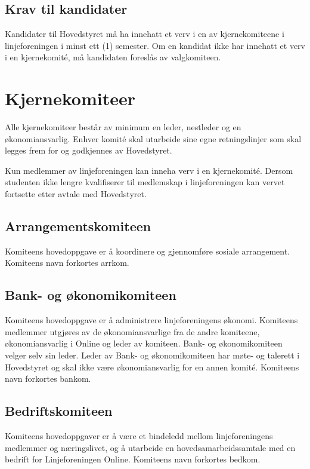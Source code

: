 \subsection{Krav til kandidater}{
Kandidater til Hovedstyret må ha innehatt et verv i en av kjernekomiteene i linjeforeningen i minst ett (1) semester. Om en kandidat ikke har innehatt et verv i en kjernekomité, må kandidaten foreslås av valgkomiteen.
}



\section{Kjernekomiteer}
\label{sec:komiteer}
\vspace{23pt}

Alle kjernekomiteer består av minimum en leder, nestleder og en økonomiansvarlig. Enhver komité skal utarbeide sine egne retningslinjer som skal legges frem for og godkjennes av Hovedstyret. \newline

Kun medlemmer av linjeforeningen kan inneha verv i en kjernekomité. Dersom studenten ikke lengre kvalifiserer til medlemskap i linjeforeningen kan vervet fortsette etter avtale med Hovedstyret.

\vspace{-10pt}
\subsection{Arrangementskomiteen}{
Komiteens hovedoppgave er å koordinere og gjennomføre sosiale arrangement. Komiteens navn forkortes arrkom.

}

\vspace{-10pt}
\subsection{Bank- og økonomikomiteen}{
Komiteens hovedoppgave er å administrere linjeforeningens økonomi. Komiteens medlemmer utgjøres av de økonomiansvarlige fra de andre komiteene, økonomiansvarlig i Online og leder av komiteen. Bank- og økonomikomiteen velger selv sin leder. Leder av Bank- og økonomikomiteen har møte- og talerett i Hovedstyret og skal ikke være økonomiansvarlig for en annen komité. Komiteens navn forkortes bankom.
}

\vspace{-10pt}
\subsection{Bedriftskomiteen}{
Komiteens hovedoppgaver er å være et bindeledd mellom linjeforeningens medlemmer og næringslivet, og å utarbeide en hovedsamarbeidssamtale med en bedrift for Linjeforeningen Online. Komiteens navn forkortes bedkom.
}

